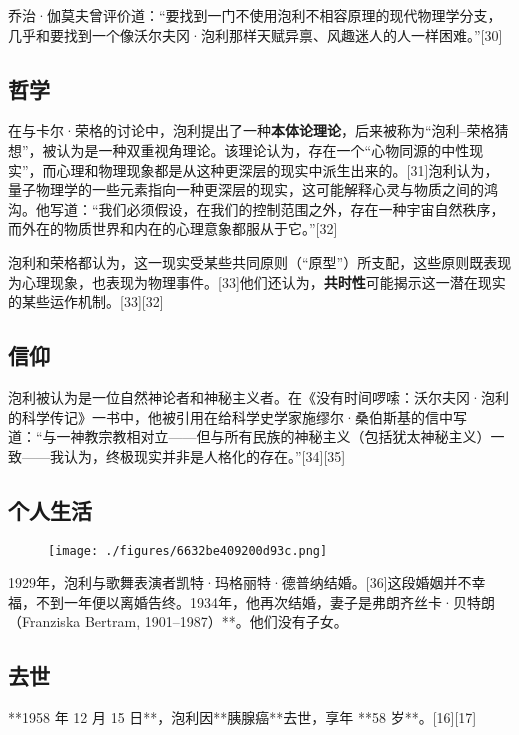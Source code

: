 乔治·伽莫夫曾评价道：“要找到一门不使用泡利不相容原理的现代物理学分支，几乎和要找到一个像沃尔夫冈·泡利那样天赋异禀、风趣迷人的人一样困难。”[30]
\subsection{哲学}  
在与卡尔·荣格的讨论中，泡利提出了一种\textbf{本体论理论}，后来被称为“泡利–荣格猜想”，被认为是一种双重视角理论。该理论认为，存在一个“心物同源的中性现实”，而心理和物理现象都是从这种更深层的现实中派生出来的。[31]泡利认为，量子物理学的一些元素指向一种更深层的现实，这可能解释心灵与物质之间的鸿沟。他写道：“我们必须假设，在我们的控制范围之外，存在一种宇宙自然秩序，而外在的物质世界和内在的心理意象都服从于它。”[32]  

泡利和荣格都认为，这一现实受某些共同原则（“原型”）所支配，这些原则既表现为心理现象，也表现为物理事件。[33]他们还认为，\textbf{共时性}可能揭示这一潜在现实的某些运作机制。[33][32]  
\subsection{信仰} 
泡利被认为是一位自然神论者和神秘主义者。在《没有时间啰嗦：沃尔夫冈·泡利的科学传记》一书中，他被引用在给科学史学家施缪尔·桑伯斯基的信中写道：“与一神教宗教相对立——但与所有民族的神秘主义（包括犹太神秘主义）一致——我认为，终极现实并非是人格化的存在。”[34][35]
\subsection{个人生活}
\begin{figure}[ht]
\centering
\texttt{[image: ./figures/6632be409200d93c.png]}
\caption{} \label{fig_Pauli2_5}
\end{figure}
1929年，泡利与歌舞表演者凯特·玛格丽特·德普纳结婚。[36]这段婚姻并不幸福，不到一年便以离婚告终。1934年，他再次结婚，妻子是弗朗齐丝卡·贝特朗（Franziska Bertram, 1901–1987）**。他们没有子女。  
\subsection{去世}  
**1958 年 12 月 15 日**，泡利因**胰腺癌**去世，享年 **58 岁**。[16][17]
